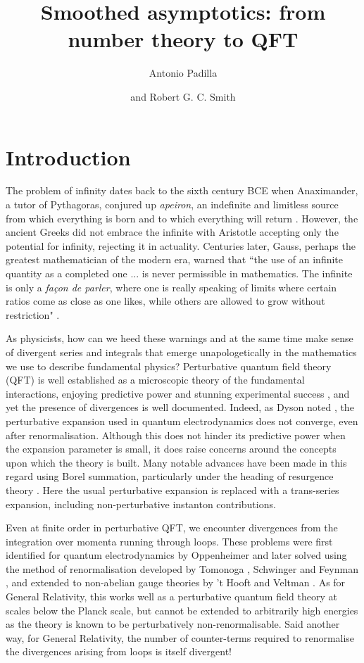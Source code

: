 \documentclass[12pt, letter]{article}
\title{Smoothed asymptotics: from number theory to QFT}
\author{Antonio Padilla}
\author{and Robert G. C. Smith}
\affiliation{School of Physics and Astronomy, University of Nottingham, University Park, Nottingham NG7 2RD, United Kingdom}
\affiliation{The Nottingham Centre of Gravity, University of Nottingham, Nottingham NG7 2RD, UK}
\begin{document}
\maketitle


\section{Introduction}
The problem of infinity dates back to the sixth century BCE when Anaximander, a tutor of Pythagoras,  conjured up {\it apeiron}, an indefinite and limitless source from which everything is born and to which everything will return \cite{moore2018infinite}.  However, the ancient Greeks did not embrace the infinite with Aristotle accepting only the potential for infinity, rejecting it in actuality. Centuries later, Gauss, perhaps the greatest mathematician of the modern era, warned that ``the use of an infinite quantity  as a completed one ... is never permissible in mathematics. The infinite is only a {\it fa\c{c}on de parler}, where one is really speaking of limits where certain ratios come as close as one likes, while others are allowed to grow without restriction" \cite{waterhouse1979gauss}.  


As physicists, how can we heed these warnings and at the same time make sense of divergent series and integrals that emerge unapologetically in the mathematics we use to describe fundamental physics? Perturbative quantum field theory (QFT) is well established as a microscopic theory of the fundamental interactions, enjoying predictive power and stunning experimental success \cite{ParticleDataGroup:2022pth}, and yet the presence of divergences is well documented.  Indeed, as Dyson noted \citep{Dyson52}, the perturbative expansion used in quantum electrodynamics  does not converge, even after renormalisation. Although this does not hinder its predictive power when the expansion parameter is small, it does raise concerns around the concepts upon which the theory is built.  Many notable advances have been made  in this regard using Borel summation, particularly under the heading of resurgence theory \citep{Dorigoni19,Dunne15qft,Marino14}. Here the usual perturbative expansion is replaced with a trans-series expansion, including non-perturbative instanton contributions. 

Even at finite order in perturbative QFT, we encounter divergences from the integration over momenta running through loops. These problems were first identified for quantum electrodynamics by Oppenheimer \cite{Oppenheimer:1930zz} and later solved using the method of renormalisation developed by Tomonoga \cite{Tomonaga:1946zz}, Schwinger \cite{Schwinger:1948iu} and Feynman \cite{Feynman:1948fi}, and extended to non-abelian gauge theories  by 't Hooft and Veltman \cite{tHooft:1972tcz}.  As for General Relativity, this works well as a perturbative quantum field theory at scales below the Planck scale, but cannot be extended to arbitrarily high energies as the theory is known to be perturbatively  non-renormalisable.  Said another way, for General Relativity, the number of counter-terms required to renormalise the divergences arising from loops is itself divergent!
\end{document}
